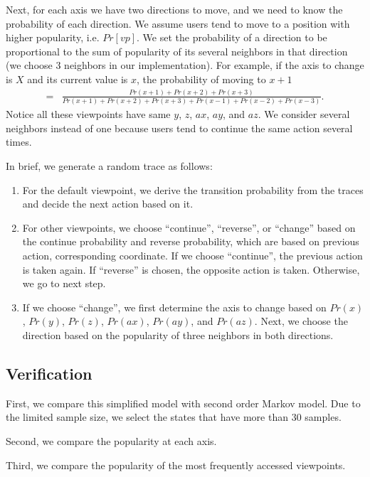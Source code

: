 Next, for each axis we have two directions to move, and we need to know the probability of each direction.
We assume users tend to move to a position with higher popularity, i.e. $Pr[vp]$. We set the probability 
of a direction to be proportional to the sum of popularity of its several neighbors in that direction (we choose
3 neighbors in our implementation). 
For example, if the axis to change is $X$ and its current value is $x$, 
the probability of moving to $x+1$  
\begin{align*}
   =&\frac{Pr(x+1)+Pr(x+2)+Pr(x+3)}
          {Pr(x+1)+Pr(x+2)+Pr(x+3)+Pr(x-1)+Pr(x-2)+Pr(x-3)}.
\end{align*}
Notice all these viewpoints have same $y$, $z$, $ax$, $ay$, and $az$.
We consider several neighbors instead of one because users tend to continue 
the same action several times. 

In brief, we generate a random trace as follows:
\begin{enumerate}
    \item For the default viewpoint, we derive the transition probability from the traces and decide the
        next action based on it.
    \item For other viewpoints, we choose ``continue'', ``reverse'', or ``change'' 
        based on the continue probability and reverse probability,
        which are based on {previous action, corresponding coordinate}.
        If we choose ``continue'', the previous action is taken again.
        If ``reverse'' is chosen, the opposite action is taken.
        Otherwise, we go to next step.
    \item If we choose ``change'', 
        we first determine the axis to change based on $Pr(x)$, $Pr(y)$, $Pr(z)$, 
        $Pr(ax)$, $Pr(ay)$, and $Pr(az)$. 
        Next, we choose the direction based on the popularity of three
        neighbors in both directions.
\end{enumerate}

\subsection{Verification}
First, we compare this simplified model with second order Markov model. Due to the limited sample size, we 
select the states that have more than 30 samples. 

Second, we compare the popularity at each axis. 

Third, we compare the popularity of the most frequently accessed viewpoints.
